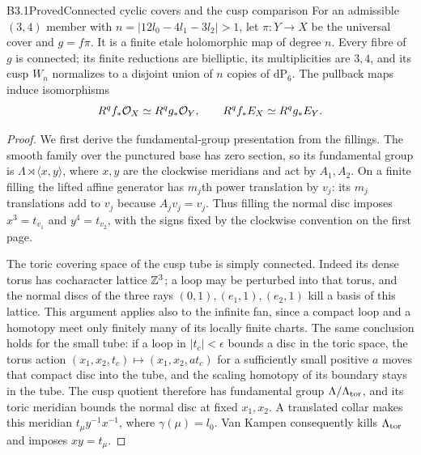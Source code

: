 \begin{claim}{B3.1}{Proved}{Connected cyclic covers and the cusp comparison}
For an admissible $(3,4)$ member with
$n=|12l_0-4l_1-3l_2|>1$, let $\pi:Y\to X$ be the universal
cover and $g=f\pi$. It is a finite etale holomorphic map of degree $n$.
Every fibre of $g$ is connected; its finite reductions are bielliptic,
its multiplicities are $3,4$, and its cusp $W_n$ normalizes to a
disjoint union of $n$ copies of $\mathrm{dP}_6$.
The pullback maps induce isomorphisms
\[
R^qf_*\mathcal O_X\simeq R^qg_*\mathcal O_Y,\qquad
R^qf_*E_X\simeq R^qg_*E_Y.
\]
\end{claim}
\begin{proof}
We first derive the fundamental-group presentation from the fillings.
The smooth family over the punctured base has zero section, so its
fundamental group is $\Lambda\rtimes\langle x,y\rangle$, where
$x,y$ are the clockwise meridians and act by $A_1,A_2$.
On a finite filling the lifted affine generator has $m_j$th power
translation by $v_j$: its $m_j$ translations add to $v_j$ because
$A_jv_j=v_j$. Thus filling the normal disc imposes
$x^3=t_{v_1}$ and $y^4=t_{v_2}$, with the signs fixed by the
clockwise convention on the first page.

The toric covering space of the cusp tube is simply connected.
Indeed its dense torus has cocharacter lattice $\mathbb Z^3$; a loop may
be perturbed into that torus, and the normal discs of the three rays
$(0,1),(e_1,1),(e_2,1)$ kill a basis of this lattice.
This argument applies also to the infinite fan, since a compact loop
and a homotopy meet only finitely many of its locally finite charts.
The same conclusion holds for the small tube: if a loop in
$|t_c|<\epsilon$ bounds a disc in the toric space, the torus action
$(x_1,x_2,t_c)\mapsto(x_1,x_2,a t_c)$ for a sufficiently small
positive $a$ moves that compact disc into the tube, and the scaling
homotopy of its boundary stays in the tube.
The cusp quotient therefore has fundamental group
$\Lambda/\Lambda_{\rm tor}$, and its toric meridian bounds the
normal disc at fixed $x_1,x_2$. A translated collar makes this
meridian $t_\mu y^{-1}x^{-1}$, where $\gamma(\mu)=l_0$.
Van Kampen consequently kills $\Lambda_{\rm tor}$ and imposes
$xy=t_\mu$.


\end{proof}

